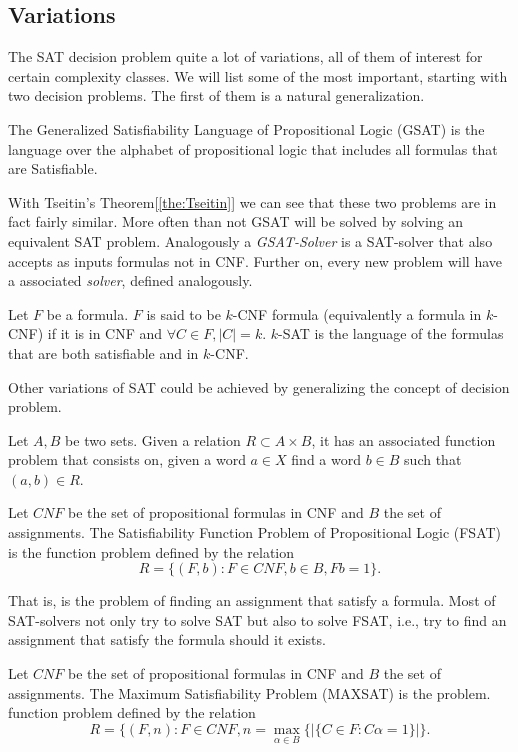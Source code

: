 \subsection{Variations}

The SAT decision problem quite a lot of variations, all of them of interest for certain complexity classes. We will list some of the most important, starting with two decision problems. The first of them is a natural generalization.

\begin{definition}
  The Generalized Satisfiability Language of Propositional Logic (GSAT) is the language over the alphabet of propositional logic that includes all formulas that are Satisfiable.
\end{definition}

With Tseitin's Theorem[\ref{the:Tseitin}] we can see that these two problems are in fact fairly similar. More often than not GSAT will be solved by solving an equivalent SAT problem. Analogously a \emph{GSAT-Solver}  is a SAT-solver that also accepts as inputs formulas not in CNF. Further on, every new problem will have a associated \emph{solver}, defined analogously.



\begin{definition}
  Let $F$ be a formula. $F$ is said to be $k$-CNF formula (equivalently a formula in $k$-CNF) if it is in CNF and $\forall C \in F, |C| = k$. $k$-SAT is the language of the formulas that are both satisfiable and in $k$-CNF.
\end{definition}

Other variations of SAT could be achieved by generalizing the concept of decision problem.

\begin{definition}
  Let $A,B$ be two sets. Given a relation $R\subset A\times B$, it has an associated function problem that consists on, given a word $a\in X$ find a word $b\in B$ such that $(a,b)\in R$.
\end{definition}

\begin{definition}
  Let $CNF$ be the set of propositional formulas in CNF and $B$ the set of assignments.  The Satisfiability Function Problem of Propositional Logic (FSAT) is the function problem defined by the relation $$R=\{(F, b): F\in CNF, b \in B, Fb = 1\}.$$
\end{definition}
That is, is the problem of finding an assignment that satisfy a formula. Most of SAT-solvers not only try to solve SAT but also to solve FSAT, i.e., try to find an assignment that satisfy  the formula should it exists.
\begin{definition}
  Let $CNF$ be the set of propositional formulas in CNF and $B$ the set of assignments. The Maximum Satisfiability Problem (MAXSAT) is the problem. function problem defined by the relation $$R=\{(F,n) : F\in CNF, n = \max_{\alpha \in B}\{ | \{C\in F : C\alpha =1 \}| \}.$$
\end{definition}

